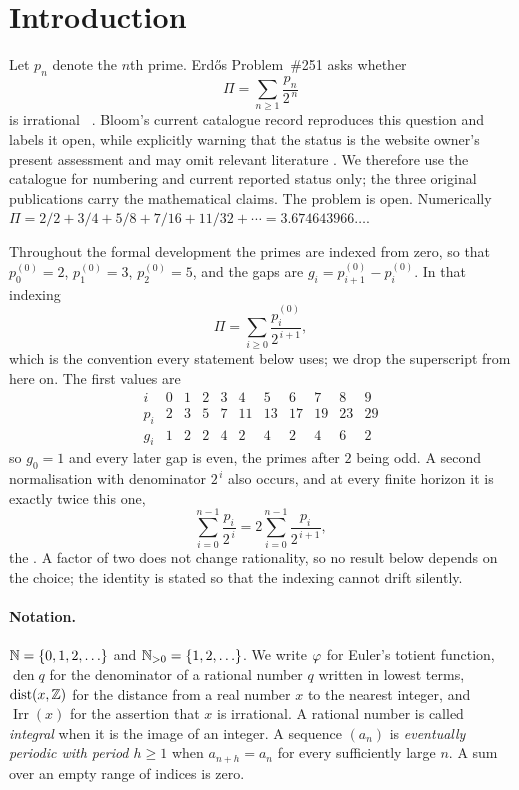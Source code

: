 \documentclass[11pt]{article}
\begin{document}
\section{Introduction}\label{sec:problem}

Let $p_n$ denote the $n$th prime.  Erd\H{o}s Problem~\#251 asks whether
\[
 \Pi=\sum_{n\ge1}\frac{p_n}{2^{\,n}}
\]
is irrational~\cite[p.~94]{erdos1958}\cite[p.~62]{erdosgraham1980}%
\cite[p.~103]{erdos1988}.  Bloom's current catalogue record reproduces this
question and labels it open, while explicitly warning that the status is the
website owner's present assessment and may omit relevant literature
\cite{erdosproblems}.  We therefore use the catalogue for numbering and
current reported status only; the three original publications carry the
mathematical claims.  The problem is open.  Numerically
$\Pi=2/2+3/4+5/8+7/16+11/32+\cdots=3.674643966\ldots$.

Throughout the formal development the primes are indexed from zero, so that
$p^{(0)}_0=2$, $p^{(0)}_1=3$, $p^{(0)}_2=5$, and the gaps are
$g_i=p^{(0)}_{i+1}-p^{(0)}_i$.  In that indexing
\[
 \Pi=\sum_{i\ge0}\frac{p^{(0)}_i}{2^{\,i+1}} ,
\]
which is the convention every statement below uses; we drop the superscript
from here on.  The first values are
\[
 \begin{array}{c|cccccccccc}
  i   & 0&1&2&3&4 &5 &6 &7 &8 &9\\\hline
  p_i & 2&3&5&7&11&13&17&19&23&29\\
  g_i & 1&2&2&4&2 &4 &2 &4 &6 &2
 \end{array}
\]
so $g_0=1$ and every later gap is even, the primes after $2$ being odd.
A second normalisation with denominator $2^{\,i}$ also occurs,
and at every finite horizon it is exactly twice this one,
\[
 \sum_{i=0}^{n-1}\frac{p_i}{2^{\,i}}
 =2\sum_{i=0}^{n-1}\frac{p_i}{2^{\,i+1}} ,
\]
the
.  A factor of two does not change rationality, so no result
below depends on the choice; the identity is stated so that the indexing cannot
drift silently.

\paragraph{Notation.}
$\mathbb{N}=\{0,1,2,\ldots\}$ and $\mathbb{N}_{>0}=\{1,2,\ldots\}$.  We write $\varphi$ for Euler's
totient function, $\operatorname{den}q$ for the denominator of a rational
number $q$ written in lowest terms, $\operatorname{dist}(x,\mathbb{Z})$ for the
distance from a real number $x$ to the nearest integer, and
$\operatorname{Irr}(x)$ for the assertion that $x$ is irrational.  A rational
number is called \emph{integral} when it is the image of an integer.  A
sequence $(a_n)$ is \emph{eventually periodic with period $h\ge1$} when
$a_{n+h}=a_n$ for every sufficiently large $n$.  A sum over an empty range of
indices is zero.
\end{document}
